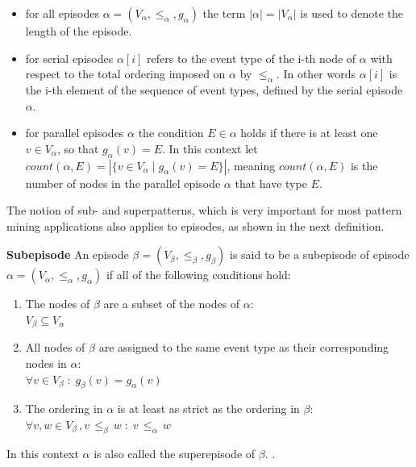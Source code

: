 \begin{itemize}
	\item for all episodes $\alpha = (V_\alpha,{\leq}_{\alpha},g_\alpha)$ the term $|\alpha | = |V_\alpha|$ is used to denote the length of the episode.
	\item for serial episodes $\alpha [i]$ refers to the event type of the i-th node of $\alpha$ with respect to the total ordering imposed on $\alpha$ by ${\leq}_{\alpha}$. In other words $\alpha [i]$ is the i-th element of the sequence of event types, defined by the serial episode $\alpha$.
	\item for parallel episodes $\alpha$ the condition $E \in \alpha$ holds if there is at least one $v \in V_\alpha$, so that $g_\alpha(v) = E$. In this context let $count(\alpha,E)= |\{v \in V_\alpha \mid g_\alpha(v) = E\}|$, meaning $count(\alpha,E)$ is the number of nodes in the parallel episode $\alpha$ that have type $E$.
\end{itemize}

The notion of sub- and superpatterns, which is very important for most pattern mining applications also applies to episodes, as shown in the next definition.

\begin{mydef}
\label{def_subEpisode}
\textbf{Subepisode} An episode $\beta = (V_\beta,{\leq}_{\beta},g_\beta)$ is said to be a subepisode of episode $\alpha = (V_\alpha,{\leq}_{\alpha},g_\alpha)$ if all of the following conditions hold:
\begin{enumerate}
	\item The nodes of $\beta$ are a subset of the nodes of $\alpha$: \\
	$V_\beta \subseteq V_\alpha$
	\item All nodes of $\beta$ are assigned to the same event type as their corresponding nodes in $\alpha$:\\
	 $\forall v \in V_\beta \; : \; g_{\beta}(v) = g_\alpha (v) $
	\item The ordering in $\alpha$ is at least as strict as the ordering in $\beta$:\\
	$\forall v,w \in V_\beta \, , v \, {\leq}_{\beta} \, w \; : \; v \, {\leq}_{\alpha} \, w$
\end{enumerate}
In this context $\alpha$ is also called the superepisode of $\beta$. \cite{mannila1995discovering,laxman2007fast}.
\end{mydef}

